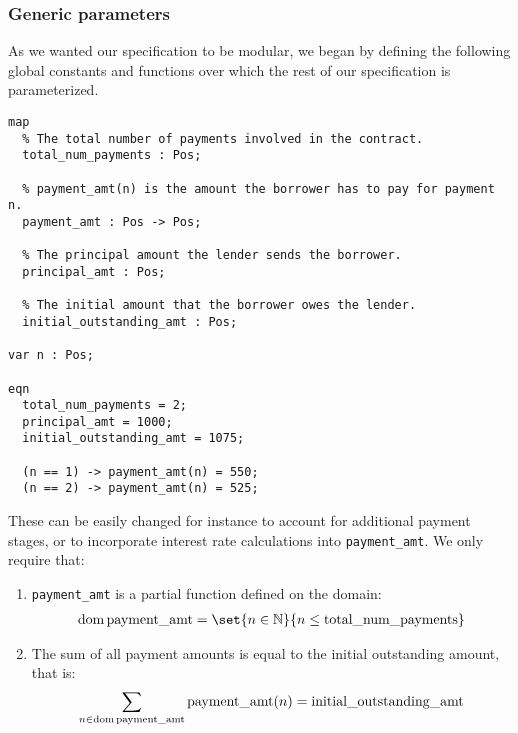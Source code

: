\documentclass{article}
\begin{document}
\subsubsection{Generic parameters}

As we wanted our specification to be modular, we began by defining the
following global constants and functions over which the rest of our
specification is parameterized.

\begin{lstlisting}
map
  % The total number of payments involved in the contract.
  total_num_payments : Pos;

  % payment_amt(n) is the amount the borrower has to pay for payment n.
  payment_amt : Pos -> Pos;

  % The principal amount the lender sends the borrower.
  principal_amt : Pos;

  % The initial amount that the borrower owes the lender.
  initial_outstanding_amt : Pos;

var n : Pos;

eqn
  total_num_payments = 2;
  principal_amt = 1000;
  initial_outstanding_amt = 1075;

  (n == 1) -> payment_amt(n) = 550;
  (n == 2) -> payment_amt(n) = 525;
\end{lstlisting}

These can be easily changed for instance to
account for additional payment stages, or to incorporate interest rate
calculations into \texttt{payment\_amt}.
We only require that:

\begin{enumerate}
  \item
  \texttt{payment\_amt} is a partial function defined on the domain:
  \begin{align*}
    \dom \text{payment\_amt} = \set{n \in \N}{n \leq \text{total\_num\_payments}}
  \end{align*}

  \item
  The sum of all payment amounts is equal to the initial outstanding amount,
  that is:
  \begin{align*}
    \sum_{n \in \operatorname{dom} \text{payment\_amt}}
      \text{payment\_amt}(n) = \text{initial\_outstanding\_amt}
  \end{align*}
\end{enumerate}
\end{document}

